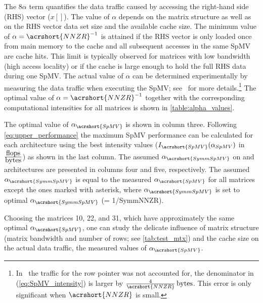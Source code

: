 The $8\alpha$ term quantifies the data traffic caused by accessing the
right-hand side (RHS) vector ($x[]$). The value of $\alpha$ depends on
the matrix structure as well as on the RHS vector data set size and
the available cache size. The minimum value of
$\alpha=\acrshort{NNZR}^{-1}$ is attained if the RHS vector is only
loaded once from main memory to the cache and all subsequent accesses
in the same \acrshort{SpMV} are cache hits. This limit is typically
observed for matrices with low bandwidth (high access locality) or if
the cache is large enough to hold the full RHS data during
one \acrshort{SpMV}. The actual value of $\alpha$ can be determined
experimentally by measuring the data traffic when executing
the \acrshort{SpMV}; see~\cite{Moritz_sell} for more
details.\footnote{In~\cite{Moritz_sell} the traffic for the row
pointer was not accounted for, \ie the denominator in
(\ref{eq:SpMV_intensity}) is larger by
$\frac{4}{\acrshort{NNZR}}\,\BYTE$. This error is only significant
when $\acrshort{NNZR}$ is small.}  The optimal value of
$\alpha=\acrshort{NNZR}^{-1}$ together with the corresponding
computational intensities for all matrices is shown in 
\cref{table:alpha_values}. 
\begin{table}[htbp]
	\footnotesize \caption{The optimal value of $\alpha_{\acrshort{SpMV}}$
	is shown in column three. Following \cref{eq:upper_performance} the
	maximum \acrshort{SpMV} performance can be calculated for each
	architecture using the best intensity values
	($I_{\acrshort{SpMV}}(\alpha_{SpMV})$ in
	$\frac{\mbox{flops}}{\mbox{bytes}}$) as shown in the last
	column.  The assumed $\alpha_{\acrshort{SymmSpMV}}$ on \SKX and 
	\IVB architectures are presented in columns four and five, respectively.
	The assumed $\alpha_{\acrshort{SymmSpMV}}$ is equal to 
	the measured $\alpha_{\acrshort{SpMV}}$ for all matrices
	except the ones marked with asterisk, where  $\alpha_{\acrshort{SymmSpMV}}$
	is set to optimal $\alpha_{\acrshort{SymmSpMV}}$ (= 1/\acrshort{SymmNNZR}).
	 \label{table:alpha_values}}
        \begin{center}  \end{center}
\end{table}
Choosing the matrices 10, 22, and 31, which have approximately the
same optimal $\alpha_{\acrshort{SpMV}}$, one can study the delicate
influence of matrix structure (\ie matrix bandwidth and number of
rows; see \cref{tab:test_mtx}) and the cache size on the actual data
traffic, \ie the measured values of $\alpha_{\acrshort{SpMV}}$.
 
